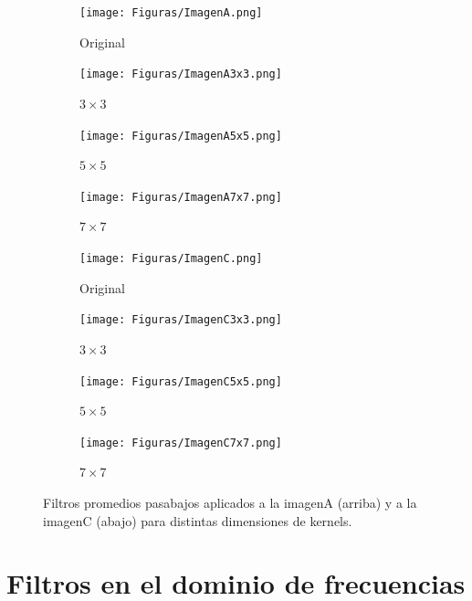 \documentclass[11pt,twocolumn,twoside]{opticajnl}
\begin{document}
\begin{figure}[h]
    \centering
         \begin{subfigure}[h]{0.24\linewidth}
            \centering
            \texttt{[image: Figuras/ImagenA.png]}
            \caption{Original} 
         \end{subfigure}
         \begin{subfigure}[h]{0.24\linewidth}
            \centering
            \texttt{[image: Figuras/ImagenA3x3.png]}
            \caption{\centering $3\times3$} 
         \end{subfigure}
         \begin{subfigure}[h]{0.24\linewidth}
            \centering
            \texttt{[image: Figuras/ImagenA5x5.png]}
            \caption{$5\times5$} 
         \end{subfigure}
         \begin{subfigure}[h]{0.24\linewidth}
            \centering
            \texttt{[image: Figuras/ImagenA7x7.png]}
            \caption{$7\times7$} 
         \end{subfigure}
         \begin{subfigure}[h]{0.24\linewidth}
            \centering
            \texttt{[image: Figuras/ImagenC.png]}
            \caption{Original} 
         \end{subfigure}
         \begin{subfigure}[h]{0.24\linewidth}
            \centering
            \texttt{[image: Figuras/ImagenC3x3.png]}
            \caption{$3\times3$} 
         \end{subfigure}
         \begin{subfigure}[h]{0.24\linewidth}
            \centering
            \texttt{[image: Figuras/ImagenC5x5.png]}
            \caption{$5\times5$} 
         \end{subfigure}
         \begin{subfigure}[h]{0.24\linewidth}
            \centering
            \texttt{[image: Figuras/ImagenC7x7.png]}
            \caption{$7\times7$} 
         \end{subfigure}
    \caption{Filtros promedios pasabajos aplicados a la imagenA (arriba) y a la imagenC (abajo) para distintas dimensiones de kernels.}
    \label{fig:Pasabajo}
\end{figure}


\section{Filtros en el dominio de frecuencias\label{sec:ej5}}
\end{document}
